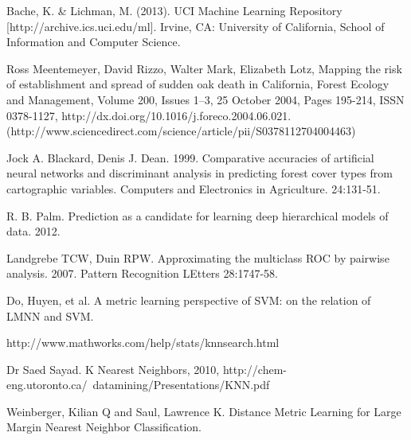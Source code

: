 \documentclass[11pt]{article}
\begin{document}
\begin{thebibliography}{}
Bache, K. \& Lichman, M. (2013). UCI Machine Learning Repository [http://archive.ics.uci.edu/ml]. Irvine, CA: University of California, School of Information and Computer Science.

Ross Meentemeyer, David Rizzo, Walter Mark, Elizabeth Lotz, Mapping the risk of establishment and spread of sudden oak death in California, Forest Ecology and Management, Volume 200, Issues 1–3, 25 October 2004, Pages 195-214, ISSN 0378-1127, http://dx.doi.org/10.1016/j.foreco.2004.06.021.
(http://www.sciencedirect.com/science/article/pii/S0378112704004463)

Jock A. Blackard, Denis J. Dean. 1999. Comparative accuracies of artificial neural networks and discriminant analysis in predicting forest cover types from cartographic variables. Computers and Electronics in Agriculture. 24:131-51.

R. B. Palm. Prediction as a candidate for learning deep hierarchical models of data. 2012.

Landgrebe TCW, Duin RPW. Approximating the multiclass ROC by pairwise analysis. 2007. Pattern Recognition LEtters 28:1747-58.

    Do, Huyen, et al. A metric learning perspective of SVM: on the relation of LMNN and SVM.

    http://www.mathworks.com/help/stats/knnsearch.html
    
    Dr Saed Sayad. K Nearest Neighbors, 2010, http://chem-eng.utoronto.ca/~datamining/Presentations/KNN.pdf
    
    Weinberger, Kilian Q and Saul, Lawrence K. Distance Metric Learning for Large Margin
Nearest Neighbor Classification.


\end{thebibliography}
\end{document}

